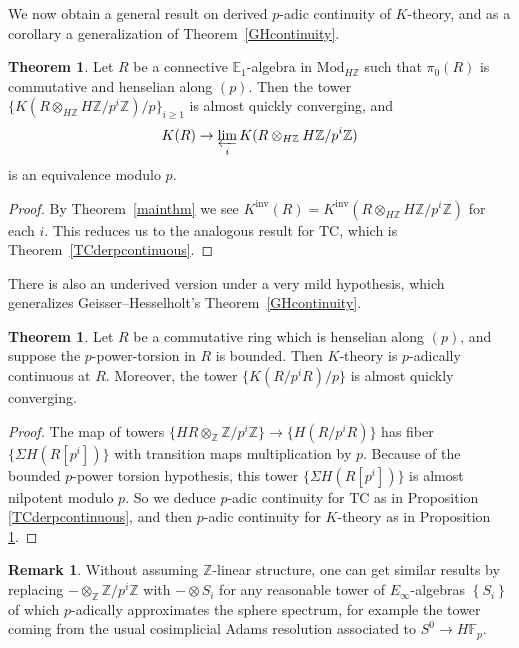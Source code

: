 \documentclass{amsart}
\newcommand{\knf}{K^{\mathrm{inv}}}
\newcommand{\md}{\mathrm{Mod}}
\theoremstyle{definition}
\newtheorem{remark}[definition]{Remark}
\newtheorem{theorem}[definition]{Theorem}
\newcommand{\TC}{\mathrm{TC}}
\begin{document}
We now obtain a general result on derived $p$-adic continuity of $K$-theory,
and as a corollary a generalization of Theorem~\ref{GHcontinuity}. 

\begin{theorem}
\label{derivedpadiccont}
Let $R$ be a connective $\mathbb{E}_1$-algebra in $\md_{H\mathbb{Z}}$ such that $\pi_0(R)$
is commutative and henselian along $(p)$. Then the tower $\{K(R  \otimes_{H\mathbb{Z}}
H\mathbb{Z}/p^i\mathbb{Z}) / p\}_{i \geq 1}$ is almost
quickly converging, and
$$K(R)\rightarrow \varprojlim_i K(R\otimes_{H\mathbb{Z}}H\mathbb{Z}/p^i\mathbb{Z})$$
is an equivalence modulo $p$.
\end{theorem}

\begin{proof} 
By Theorem~\ref{mainthm} we see $\knf(R) = \knf(R \otimes_{H\mathbb{Z}}
H\mathbb{Z}/p^i \mathbb{Z})$ for
each $i$. This reduces us to the analogous result for $\TC$, which is Theorem~\ref{TCderpcontinuous}. 
\end{proof} 

There is also an underived version under a very mild hypothesis, which
generalizes Geisser--Hesselholt's Theorem~\ref{GHcontinuity}.
\begin{theorem} 
Let $R$ be a commutative ring which 
is henselian along $(p)$, and suppose the $p$-power-torsion in $R$ is bounded. Then 
$K$-theory is $p$-adically continuous at $R$. Moreover, the tower $\{K(R/p^iR)/p\}$ is almost quickly converging.
\end{theorem}
\begin{proof} 
The map of towers $\{HR\otimes_\mathbb{Z}\mathbb{Z}/p^i\mathbb{Z}\}\rightarrow
\{H(R/p^iR)\}$ has fiber $\{\Sigma H(R[p^i])\}$ with transition maps multiplication by
$p$.  Because of the bounded $p$-power torsion hypothesis, this tower
$\{\Sigma H(R[p^i])\}$ is almost nilpotent modulo $p$.  So we deduce $p$-adic
continuity for $\TC$ as in Proposition \ref{TCderpcontinuous}, and then $p$-adic
continuity for $K$-theory as in Proposition \ref{derivedpadiccont}.
\end{proof}

\begin{remark}
Without assuming $\mathbb{Z}$-linear structure, one can get similar results by
replacing $-\otimes_\mathbb{Z}\mathbb{Z}/p^i\mathbb{Z}$ with $-\otimes S_i$ for
any reasonable tower of $E_\infty$-algebras $\left\{S_i\right\}$ of which $p$-adically approximates the sphere spectrum, for example the tower coming from the usual cosimplicial Adams resolution associated to $S^0\rightarrow H\mathbb{F}_p$.
\end{remark}
\end{document}
